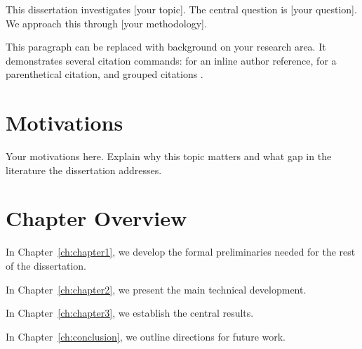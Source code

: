 
This dissertation investigates [your topic].  The central question
is [your question].  We approach this through [your methodology].

This paragraph can be replaced with background on your research
area.  It demonstrates several citation commands:
\textcite{kripke1959} for an inline author reference,
\parencite{chellas1980} for a parenthetical citation, and grouped
citations \cite{scott1970, blackburn2001, pacuit2017}.

\section{Motivations}

Your motivations here.  Explain why this topic matters and what gap
in the literature the dissertation addresses.

\section{Chapter Overview}

In Chapter~\ref{ch:chapter1}, we develop the formal preliminaries
needed for the rest of the dissertation.

In Chapter~\ref{ch:chapter2}, we present the main technical
development.

In Chapter~\ref{ch:chapter3}, we establish the central results.

In Chapter~\ref{ch:conclusion}, we outline directions for future work.
